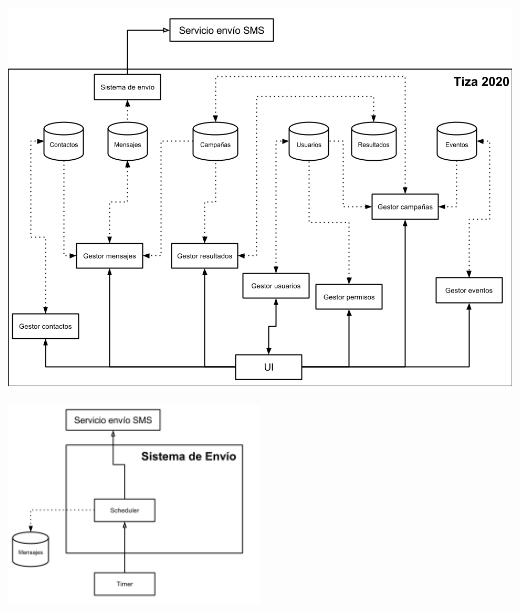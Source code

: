 \documentclass[a4paper, 11pt]{article}
\begin{document}
\centerline{\includegraphics[width=1.2\textwidth]{./diagramas/ArquitecturaTP1.png}}
\centerline{\includegraphics[width=0.5\textwidth]{./diagramas/ArqTP1SistEnvio.png}}
\end{document}

